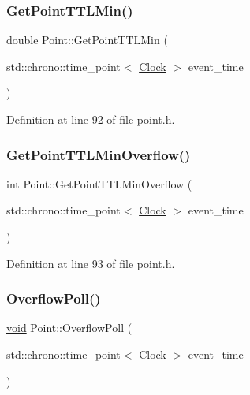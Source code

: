 \subsubsection{\texorpdfstring{Get\+Point\+T\+T\+L\+Min()}{GetPointTTLMin()}}
{\footnotesize\ttfamily double Point\+::\+Get\+Point\+T\+T\+L\+Min (\begin{DoxyParamCaption}\item[{std\+::chrono\+::time\+\_\+point$<$ \mbox{\hyperlink{universe_8h_a0ef8d951d1ca5ab3cfaf7ab4c7a6fd80}{Clock}} $>$}]{event\+\_\+time }\end{DoxyParamCaption})\hspace{0.3cm}{\ttfamily [inline]}}



Definition at line 92 of file point.\+h.

\mbox{\label{class_point_a72b222f880df30ebcc12ddc1a6d430b5}} 
\subsubsection{\texorpdfstring{Get\+Point\+T\+T\+L\+Min\+Overflow()}{GetPointTTLMinOverflow()}}
{\footnotesize\ttfamily int Point\+::\+Get\+Point\+T\+T\+L\+Min\+Overflow (\begin{DoxyParamCaption}\item[{std\+::chrono\+::time\+\_\+point$<$ \mbox{\hyperlink{universe_8h_a0ef8d951d1ca5ab3cfaf7ab4c7a6fd80}{Clock}} $>$}]{event\+\_\+time }\end{DoxyParamCaption})\hspace{0.3cm}{\ttfamily [inline]}}



Definition at line 93 of file point.\+h.

\mbox{\label{class_point_a44c69c43cfdcb3273d0e6786a21fd000}} 
\subsubsection{\texorpdfstring{Overflow\+Poll()}{OverflowPoll()}}
{\footnotesize\ttfamily \mbox{\hyperlink{glad_8h_a950fc91edb4504f62f1c577bf4727c29}{void}} Point\+::\+Overflow\+Poll (\begin{DoxyParamCaption}\item[{std\+::chrono\+::time\+\_\+point$<$ \mbox{\hyperlink{universe_8h_a0ef8d951d1ca5ab3cfaf7ab4c7a6fd80}{Clock}} $>$}]{event\+\_\+time }\end{DoxyParamCaption})}



